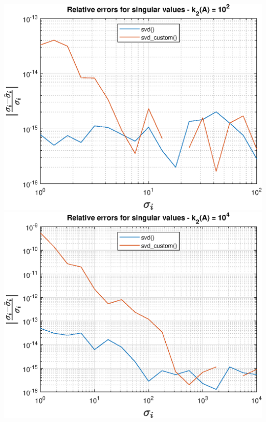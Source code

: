 \centering
\par \vspace{15pt}
\includegraphics[scale=.9]{imgs/10_-_Relative_errors_for_singular_values_-_k_2(A)_=_10^2.eps}
\newpage
\includegraphics[scale=.9]{imgs/11_-_Relative_errors_for_singular_values_-_k_2(A)_=_10^4.eps}
\par \vspace{15pt}
